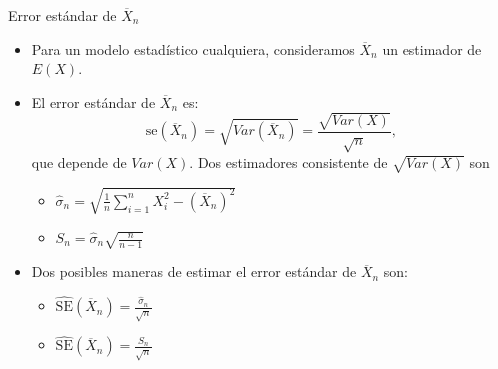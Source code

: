 \documentclass{beamer}
\theoremstyle{definition}
\begin{document}
\begin{frame}{\color{rosee}Error est\'andar de $\overline{X}_n$} \small
\begin{itemize}[leftmargin=*]
    \item  Para un modelo estadístico cualquiera, consideramos $\overline{X}_n$ un estimador de $E(X)$.
  \item  El error est\'andar de $\overline{X}_{n}$ es:
    \[\text{se}(\overline{X}_{n}) = \sqrt{Var\left(\overline{X}_{n}\right)}= \frac{\sqrt{Var(X)}}{\sqrt{n}},\]
    que depende de $Var(X)$. Dos estimadores consistente de $\sqrt{Var(X)}$ son
    \begin{itemize}
        \item $\widehat{\sigma}_n= \sqrt{\frac{1}{n} \sum_{i=1}^{n}X_{i}^{2}
      - \left(\overline{X}_{n}\right)^{2}}$
      \item $S_n= \widehat{\sigma}_n \sqrt{\frac{n}{n-1}}$
    \end{itemize}
    
    \item Dos posibles maneras de estimar el error est\'andar de $\overline{X}_{n}$ son:
    \begin{itemize}
        \item  $\widehat{\text{SE}}(\overline{X}_{n}) = \frac{\widehat{\sigma}_n}{\sqrt{n}}$
        \item  $\widehat{\text{SE}}(\overline{X}_{n}) = \frac{S_n}{\sqrt{n}}$
    \end{itemize}
  
  \end{itemize}

\end{frame}
\end{document}

